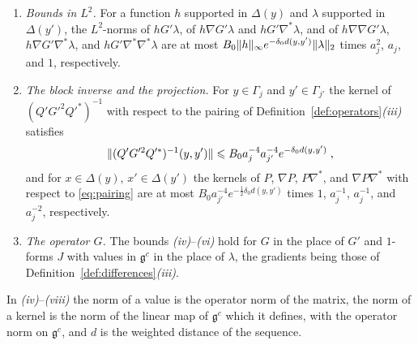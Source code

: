 \documentclass[11pt]{preprint}
\DeclarePairedDelimiter{\norm}{\lVert}{\rVert}
\numberwithin{equation}{section}
\begin{document}
\begin{theorem}
\begin{enumerate}[label=(\roman*)]
\begin{align}
    \norm{\zeta\nabla G'\lambda}_\beta,\ \norm{\zeta G'\nabla^*\lambda}_\beta &\leqslant B_0(\beta_0)a_j^{1-\beta}\bigl(\norm\zeta_\beta^{(j)} + \norm\zeta_\infty\bigr)e^{-\delta_0d(y, y')}\norm\lambda_\infty\;,\label{eq:propagator-holder}\\
    \norm{(\nabla G'\nabla^*\lambda)(x)} &\leqslant B'_0(\epsilon, 0)e^{-\delta_0d(y, y')}\bigl(\norm\lambda_\epsilon^{(j')} + \norm\lambda_\infty\bigr)\;,\label{eq:propagator-second}\\
    \norm{\zeta\nabla G'\nabla^*\lambda}_\beta &\leqslant B'_0(\epsilon, \beta_0)a_j^{-\beta}\bigl(\norm\zeta_\beta^{(j)} + \norm\zeta_\infty\bigr)e^{-\delta_0d(y, y')}\bigl(\norm\lambda_{\beta+\epsilon}^{(j')} + \norm\lambda_\infty\bigr)\;,\label{eq:propagator-second-holder}
\end{align}
the last for $\beta + \epsilon \leqslant 1$.
\item \emph{Bounds in $L^2$.} For a function $h$ supported in $\Delta(y)$ and $\lambda$ supported in $\Delta(y')$, the $L^2$-norms of $hG'\lambda$, of $h\nabla G'\lambda$ and $hG'\nabla^*\lambda$, and of $h\nabla\nabla G'\lambda$, $h\nabla G'\nabla^*\lambda$, and $hG'\nabla^*\nabla^*\lambda$ are at most $B_0\norm h_\infty e^{-\delta_0d(y, y')}\norm\lambda_2$ times $a_j^2$, $a_j$, and $1$, respectively.
\item \emph{The block inverse and the projection.} For $y \in \Gamma_j$ and $y' \in \Gamma_{j'}$ the kernel of $(Q'G'^2Q'^*)^{-1}$ with respect to the pairing of Definition~\ref{def:operators}\emph{(iii)} satisfies
\begin{equation}\label{eq:block-inverse-bound}
    \norm{(Q'G'^2Q'^*)^{-1}(y, y')} \leqslant B_0a_j^{-4}a_{j'}^{-4}e^{-\delta_0d(y, y')}\;,
\end{equation}
and for $x \in \Delta(y)$, $x' \in \Delta(y')$ the kernels of $P$, $\nabla P$, $P\nabla^*$, and $\nabla P\nabla^*$ with respect to \eqref{eq:pairing} are at most $B_0a_{j'}^{-4}e^{-\frac{1}{2}\delta_0d(y, y')}$ times $1$, $a_j^{-1}$, $a_j^{-1}$, and $a_j^{-2}$, respectively.
\item \emph{The operator $G$.} The bounds \emph{(iv)}--\emph{(vi)} hold for $G$ in the place of $G'$ and $1$-forms $J$ with values in $\mathfrak g^c$ in the place of $\lambda$, the gradients being those of Definition~\ref{def:differences}\emph{(iii)}.
\end{enumerate}
In \emph{(iv)}--\emph{(viii)} the norm of a value is the operator norm of the matrix, the norm of a kernel is the norm of the linear map of $\mathfrak g^c$ which it defines, with the operator norm on $\mathfrak g^c$, and $d$ is the weighted distance of the sequence.
\end{theorem}
\end{document}
